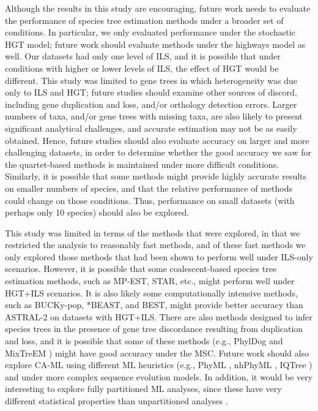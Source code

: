Although the results in this study are encouraging, 
future work needs to evaluate the performance of species tree
estimation methods under a broader set of conditions. 
In particular, we only evaluated performance under the stochastic HGT model; future work should evaluate methods under the highways model as well.
Our datasets had only one level of ILS, and
it is possible that under conditions with higher 
or lower levels of ILS, the effect of HGT would be different. 
This study was limited to gene trees in which heterogeneity was due only to ILS and HGT; future studies should examine other sources of discord, including gene duplication and loss, and/or orthology detection errors. 
Larger numbers of taxa, and/or gene trees with missing taxa, are also likely to present significant analytical challenges, and accurate estimation may not be as easily obtained.
Hence, future studies should also evaluate accuracy on larger
and more challenging
datasets, in order to determine whether the good accuracy
we saw for the quartet-based methods
is maintained under more difficult conditions.
Similarly, it is possible that some methods might provide highly accurate
results on smaller numbers of species, and that the relative
performance of methods could change on those conditions.
Thus, performance on small datasets (with perhaps only 10 species) should
also be explored.

This study was limited in terms of the methods that were
explored, in that we restricted the analysis to reasonably
fast methods, and of these fast methods we only explored
those methods
that had been shown to perform well under ILS-only scenarios.
However, it is possible that some coalescent-based species 
tree estimation methods, such as
MP-EST, STAR, etc., might perform
well under HGT+ILS scenarios.
It is also likely  some computationally 
intensive methods, such as BUCKy-pop,
*BEAST, and BEST,  might provide
better accuracy than ASTRAL-2 
on datasets with HGT+ILS. 
There are also methods designed to infer species trees in the presence of
gene tree discordance resulting from duplication and loss, and it is
possible that 
some of these methods (e.g., PhylDog \cite{phyldog} and
MixTreEM \cite{MixTreEM}) might 
have good accuracy under the MSC.
Future work should also explore CA-ML using different ML heuristics
(e.g., PhyML \cite{PhyML}, nhPhyML \cite{nhPhyML}, IQTree \cite{IQTree})
and under more complex sequence evolution models. 
In addition,  it would be very interesting to explore
fully partitioned ML 
analyses, since these have very different statistical properties
than unpartitioned analyses \cite{WarnowCurrents2015}.

